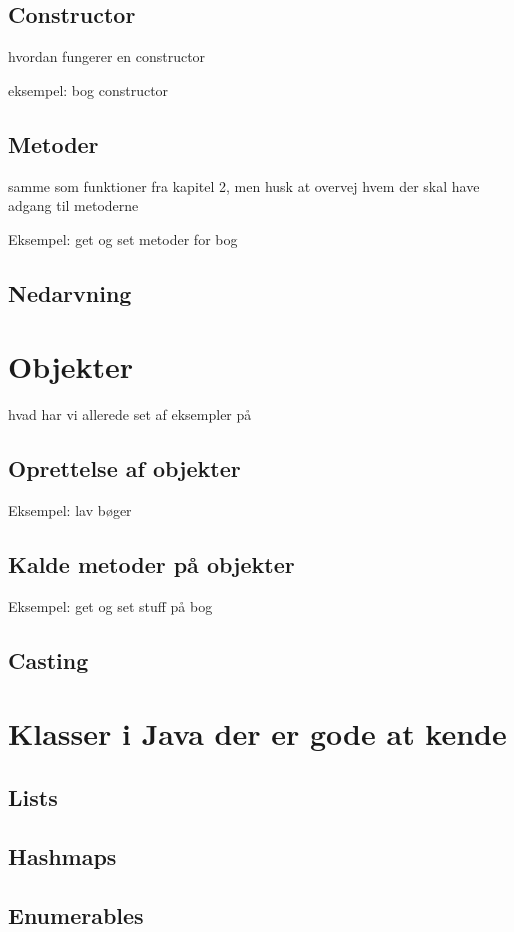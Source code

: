 \subsection{Constructor}

hvordan fungerer en constructor

eksempel: bog constructor

\subsection{Metoder}

samme som funktioner fra kapitel 2, men husk at overvej hvem der skal have adgang til metoderne

Eksempel: get og set metoder for bog

\subsection{Nedarvning}

\section{Objekter}

hvad har vi allerede set af eksempler på

\subsection{Oprettelse af objekter}

Eksempel: lav bøger

\subsection{Kalde metoder på objekter}

Eksempel: get og set stuff på bog

\subsection{Casting}

\section{Klasser i Java der er gode at kende}

\subsection{Lists}

\subsection{Hashmaps}

\subsection{Enumerables}


